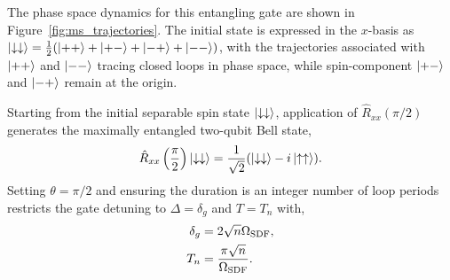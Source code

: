 The phase space dynamics for this entangling gate are shown in
Figure~\ref{fig:ms_trajectories}. The initial state is expressed in the
$x$-basis as $\ket{\downarrow\downarrow}=\frac{1}{2}(\ket{++}+\ket{+-}+\ket{-+}+\ket{--})$,
with the trajectories associated with $\ket{++}$ and $\ket{--}$ tracing closed
loops in phase space, while spin-component 
$\ket{+-}$ and $\ket{-+}$ remain at the origin.

Starting from the initial separable spin state $\ket{\downarrow\downarrow}$, application of $\hat R_{xx}(\pi/2)$ generates the maximally entangled two-qubit Bell state,
\begin{equation}
    \hat R_{xx}\left(\frac{\pi}{2}\right) \ket{\downarrow\downarrow} = \frac{1}{\sqrt{2}}(\ket{\downarrow\downarrow}-i\ket{\uparrow\uparrow}).
\end{equation}
Setting $\theta = \pi/2$ and ensuring the duration is an integer number of loop periods restricts the gate detuning to $\Delta = \delta_g$ and $T = T_n$ with,
\begin{subequations}
    \label{eqn:nloop}
\begin{align}
\delta_g &= 2\sqrt{n}\Omega_{\rm SDF},\\
T_n &= \frac{\pi\sqrt{n}}{\Omega_{\rm SDF}}.
\end{align}
\end{subequations}
